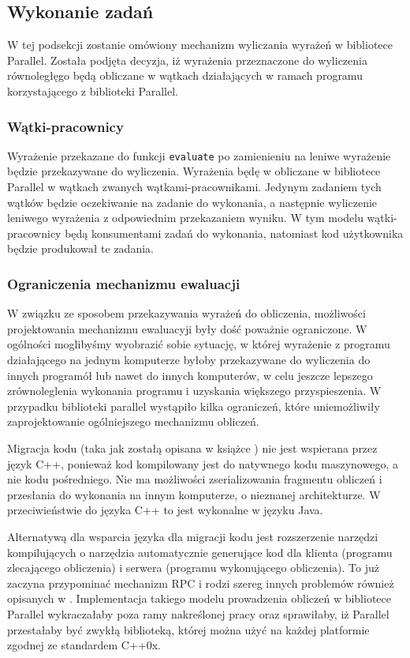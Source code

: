\subsection{Wykonanie zadań}

  W tej podsekcji zostanie omówiony mechanizm wyliczania wyrażeń w bibliotece Parallel.
  Została podjęta decyzja, iż wyrażenia przeznaczone do wyliczenia równoległęgo będą obliczane w wątkach działających w ramach programu korzystającego z biblioteki Parallel.
  
\subsubsection{Wątki-pracownicy}

  Wyrażenie przekazane do funkcji \texttt{evaluate} po zamienieniu na leniwe wyrażenie będzie przekazywane do wyliczenia.
  Wyrażenia będę w obliczane w bibliotece Parallel w wątkach zwanych wątkami-pracownikami.
  Jedynym zadaniem tych wątków będzie oczekiwanie na zadanie do wykonania, a następnie wyliczenie leniwego wyrażenia z odpowiednim przekazaniem wyniku.
  W tym modelu wątki-pracownicy będą konsumentami zadań do wykonania, natomiast kod użytkownika będzie produkował te zadania.
  
  
\subsubsection{Ograniczenia mechanizmu ewaluacji}

  W związku ze sposobem przekazywania wyrażeń do obliczenia, możliwości projektowania mechanizmu ewaluacyji były dość poważnie ograniczone.
  W ogólności moglibyśmy wyobrazić sobie sytuację, w której wyrażenie z programu działającego na jednym komputerze byłoby przekazywane do wyliczenia do innych programół lub nawet do innych komputerów, w celu jeszcze lepszego zrównoleglenia wykonania programu i uzyskania większego przyspieszenia.
  W przypadku biblioteki parallel wystąpiło kilka ograniczeń, które uniemożliwiły zaprojektowanie ogólniejszego mechanizmu obliczeń.
  
  Migracja kodu (taka jak zostałą opisana w książce \cite{dissys}) nie jest wspierana przez język C++, ponieważ kod kompilowany jest do natywnego kodu maszynowego, a nie kodu pośredniego.
  Nie ma możliwości zserializowania fragmentu obliczeń i przesłania do wykonania na innym komputerze, o nieznanej architekturze.
  W przeciwieństwie do języka C++ to jest wykonalne w języku Java.
  
  Alternatywą dla wsparcia języka dla migracji kodu jest rozszerzenie narzędzi kompilujących o narzędzia automatycznie generujące kod dla klienta (programu zlecającego obliczenia) i serwera (programu wykonującego obliczenia).
  To już zaczyna przypominać mechanizm RPC i rodzi szereg innych problemów również opisanych w \cite{dissys}.
  Implementacja takiego modelu prowadzenia obliczeń w bibliotece Parallel wykraczałaby poza ramy nakreślonej pracy oraz sprawiłaby, iż Parallel przestałaby być zwykłą biblioteką, 
  której można użyć na każdej platformie zgodnej ze standardem C++0x.
  
